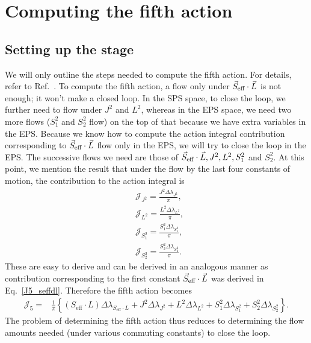 \section{Computing the fifth action}


\subsection{Setting up the stage}


We will only outline the steps needed to compute the fifth action. For details,
refer to Ref.~\cite{tanay2021action}. To compute the fifth action,
a flow only under $\vec{S}_{\text{eff}}\cdot \vec{L}$ is not enough; it won't make a closed loop.
In the SPS space, to close the loop, we further need to flow under
$J^2$ and $L^2$, whereas in the EPS space, we need two more flows 
($S_1^2$ and $S_2^2$ flow) on the
top of that because we have extra variables in the EPS. Because we know
how to compute the action integral  contribution corresponding
to $\vec{S}_{\text{eff}}\cdot \vec{L}$ flow only in the EPS, we will try to close the loop in the EPS.
The successive flows we need are those of $\vec{S}_{\text{eff}}\cdot \vec{L}, J^2, L^2, S_1^2$ and $S_2^2$.
At this point, we mention the result that under the flow by 
the last four 
constants of motion, the contribution to the action integral is 
\begin{equation}
\begin{aligned}
&\mathcal{J}_{J^{2}}=\frac{J^{2} \Delta \lambda_{J^{2}}}{\pi} , \\
&\mathcal{J}_{L^{2}}=\frac{L^{2} \Delta \lambda_{L^{2}}}{\pi}, \\
&\mathcal{J}_{S_{1}^{2}}=\frac{S_{1}^{2} \Delta \lambda_{S_{1}^{2}}}{\pi}, \\
&\mathcal{J}_{S_{2}^{2}}=\frac{S_{2}^{2} \Delta \lambda_{S_{2}^{2}}}{\pi}.
\end{aligned}
\end{equation}
These are easy to derive and can be derived in an
analogous manner as contribution corresponding to the first
constant $\vec{S}_{\text{eff}}\cdot \vec{L}$ was derived in Eq.~\eqref{J5_seffdl}. Therefore the 
fifth action becomes
\begin{equation}     \label{J5_final}
\begin{aligned}
\mathcal{J}_{5}=& \frac{1}{\pi}\left\{\left(S_{\mathrm{eff}} \cdot L\right) \Delta \lambda_{S_{\mathrm{eff}} \cdot L}+J^{2} \Delta \lambda_{J^{2}}+L^{2} \Delta \lambda_{L^{2}}
+S_{1}^{2} \Delta \lambda_{S_{1}^{2}}+S_{2}^{2} \Delta \lambda_{S_{2}^{2}}\right\} .
\end{aligned}
\end{equation}
The problem of determining the fifth action thus reduces to determining 
the flow amounts needed (under various commuting constants) to close the loop.



